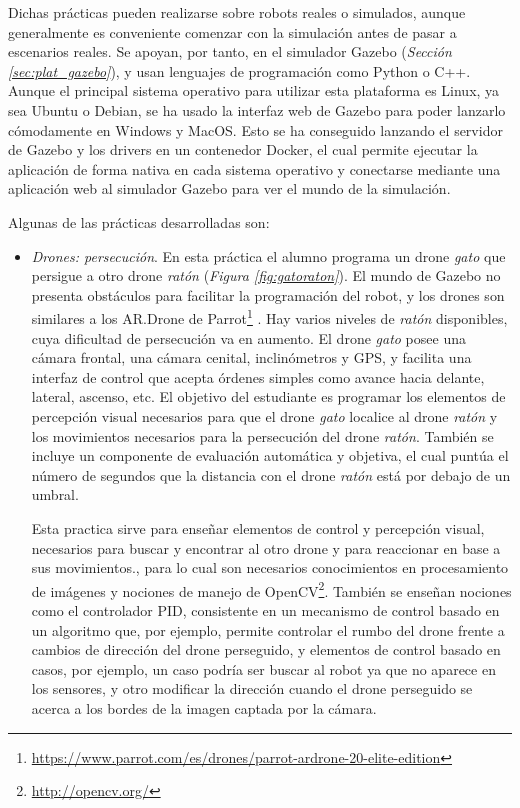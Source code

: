Dichas prácticas pueden realizarse sobre robots reales o simulados, aunque generalmente es conveniente comenzar con la simulación antes de pasar a escenarios reales. Se apoyan, por tanto, en el simulador Gazebo (\textit{Sección \ref{sec:plat_gazebo}}), y usan lenguajes de programación como Python o C++. Aunque el principal sistema operativo para utilizar esta plataforma es Linux, ya sea Ubuntu o Debian, se ha usado la interfaz web de Gazebo para poder lanzarlo cómodamente en Windows y MacOS. Esto se ha conseguido lanzando el servidor de Gazebo y los drivers en un contenedor Docker, el cual permite ejecutar la aplicación de forma nativa en cada sistema operativo y conectarse mediante una aplicación web al simulador Gazebo para ver el mundo de la simulación.

Algunas de las prácticas desarrolladas son:
\begin{itemize}
	\item \textit{Drones: persecución}. En esta práctica el alumno programa un drone \textit{gato} que persigue a otro drone \textit{ratón} (\textit{Figura \ref{fig:gatoraton}}). El mundo de Gazebo no presenta obstáculos para facilitar la programación del robot, y los drones son similares a los AR.Drone de Parrot\footnote{\url{https://www.parrot.com/es/drones/parrot-ardrone-20-elite-edition}} . Hay varios niveles de \textit{ratón} disponibles, cuya dificultad de persecución va en aumento. El drone \textit{gato} posee una cámara frontal, una cámara cenital, inclinómetros y GPS, y facilita una interfaz de control que acepta órdenes simples como avance hacia delante, lateral, ascenso, etc. El objetivo del estudiante es programar los elementos de percepción visual necesarios para que el drone \textit{gato} localice al drone \textit{ratón} y los movimientos necesarios para la persecución del drone \textit{ratón}. También se incluye un componente de evaluación automática y objetiva, el cual puntúa el número de segundos que la distancia con el drone \textit{ratón} está por debajo de un umbral.
	
	Esta practica sirve para enseñar elementos de control y percepción visual, necesarios para buscar y encontrar al otro drone y para reaccionar en base a sus movimientos., para lo cual son necesarios conocimientos en procesamiento de imágenes y nociones de manejo de OpenCV\footnote{\url{http://opencv.org/}}. También se enseñan nociones como el controlador PID, consistente en un mecanismo de control basado en un algoritmo que, por ejemplo, permite controlar el rumbo del drone frente a cambios de dirección del drone perseguido, y elementos de control basado en casos, por ejemplo, un caso podría ser buscar al robot ya que no aparece en los sensores, y otro modificar la dirección cuando el drone perseguido se acerca a los bordes de la imagen captada por la cámara.


\end{itemize}
